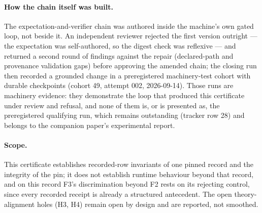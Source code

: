 \paragraph{How the chain itself was built.}  The expectation-and-verifier
chain was authored inside the machine's own gated loop, not beside it.
An independent reviewer rejected the first version outright --- the
expectation was self-authored, so the digest check was reflexive --- and
returned a second round of findings against the repair (declared-path
and provenance validation gaps) before approving the amended chain; the
closing run then recorded a grounded change in a preregistered
machinery-test cohort with durable checkpoints (cohort 49, attempt 002,
2026-09-14).  Those runs are machinery evidence: they demonstrate the
loop that produced this certificate under review and refusal, and none
of them is, or is presented as, the preregistered qualifying run, which
remains outstanding (tracker row 28) and belongs to the companion
paper's experimental report.

\paragraph{Scope.}  This certificate establishes recorded-row invariants
of one pinned record and the integrity of the pin; it does not establish
runtime behaviour beyond that record, and on this record F3's
discrimination beyond F2 rests on its rejecting control, since every
recorded receipt is already a structured antecedent.  The open
theory-alignment holes (H3, H4) remain open by design and are reported,
not smoothed.
